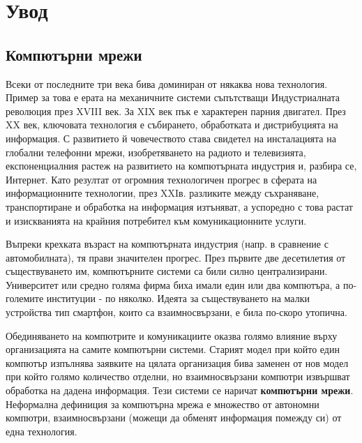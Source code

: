 \documentclass[9pt,a4paper,oneside]{extbook}
\begin{document}
\pagestyle{empty}

\pagestyle{plain}

\tableofcontents
\vfill

\setcounter{chapter}{-1}
\chapter{Увод}
\onehalfspacing
\pagestyle{fancy}
\fancyhf{}
\fancyhead[OC]{\leftmark}
\fancyhead[EC]{\rightmark}
\cfoot{\thepage}

\section{Компютърни мрежи}
\justify
Всеки от последните три века бива доминиран от някаква нова технология. Пример
за това е ерата на механичните системи съпътстващи Индустриалната революция през
XVIII век. За XIX век пък е характерен парния двигател. През XX век, ключовата
технология е събирането, обработката и дистрибуцията на информация. С развитието
й човечеството става свидетел на инсталацията на глобални телефонни мрежи,
изобретяването на радиото и телевизията, експоненциалния растеж на развитието на
компютърната индустрия и, разбира се, Интернет. Като резултат от огромния
технологичен прогрес в сферата на информационните технологии, през XXIв.
разликите между съхраняване, транспортиране и обработка на информация изтъняват,
а успоредно с това растат и изискванията на крайния потребител към
комуникационните услуги.

Въпреки крехката възраст на компютърната индустрия (напр. в сравнение с
автомобилната), тя прави значителен прогрес. През първите две десетилетия от
съществуването им, компютърните системи са били силно централизирани.
Университет или средно голяма фирма биха имали един или два компютъра, а
по-големите институции - по няколко. Идеята за съществуването на малки
устройства тип смартфон, които са взаимносвързани, е била по-скоро утопична.

Обединяването на компютрите и комуникациите оказва голямо влияние върху
организацията на самите компютърни системи. Старият модел при който един
компютър изпълнява заявките на цялата организация бива заменен от нов модел при
който голямо количество отделни, но взаимносвързани компютри извършват обработка
на дадена информация. Тези системи се наричат \textbf{компютърни мрежи}.
Неформална дефиниция за компютърна мрежа е множество от автономни компютри,
взаимносвързани (можещи да обменят информация помежду си) от една технология.
\end{document}
